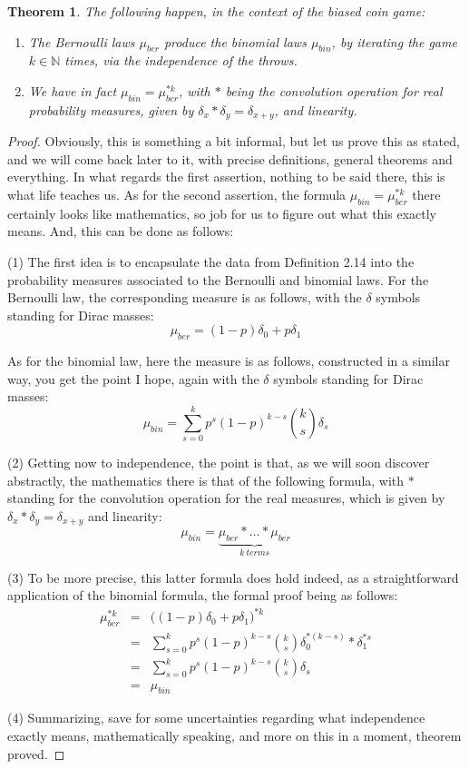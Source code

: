 \documentclass[12pt]{amsbook}
\newtheorem{theorem}{Theorem}[chapter]
\begin{document}
\begin{theorem}
The following happen, in the context of the biased coin game:
\begin{enumerate}
\item The Bernoulli laws $\mu_{ber}$ produce the binomial laws $\mu_{bin}$, by iterating the game $k\in\mathbb N$ times, via the independence of the throws.

\item We have in fact $\mu_{bin}=\mu_{ber}^{*k}$, with $*$ being the convolution operation for real probability measures, given by $\delta_x*\delta_y=\delta_{x+y}$, and linearity.
\end{enumerate}
\end{theorem}

\begin{proof}
Obviously, this is something a bit informal, but let us prove this as stated, and we will come back later to it, with precise definitions, general theorems and everything. In what regards the first assertion, nothing to be said there, this is what life teaches us. As for the second assertion, the formula $\mu_{bin}=\mu_{ber}^{*k}$ there certainly looks like mathematics, so job for us to figure out what this exactly means. And, this can be done as follows:

\bigskip

(1) The first idea is to encapsulate the data from Definition 2.14 into the probability measures associated to the Bernoulli and binomial laws. For the Bernoulli law, the corresponding measure is as follows, with the $\delta$ symbols standing for Dirac masses:
$$\mu_{ber}=(1-p)\delta_0+p\delta_1$$

As for the binomial law, here the measure is as follows, constructed in a similar way, you get the point I hope, again with the $\delta$ symbols standing for Dirac masses:
$$\mu_{bin}=\sum_{s=0}^kp^s(1-p)^{k-s}\binom{k}{s}\delta_s$$

(2) Getting now to independence, the point is that, as we will soon discover abstractly, the mathematics there is that of the following formula, with $*$ standing for the convolution operation for the real measures, which is given by $\delta_x*\delta_y=\delta_{x+y}$ and linearity:
$$\mu_{bin}=\underbrace{\mu_{ber}*\ldots*\mu_{ber}}_{k\ terms}$$

(3) To be more precise, this latter formula does hold indeed, as a straightforward application of the binomial formula, the formal proof being as follows:
\begin{eqnarray*}
\mu_{ber}^{*k}
&=&\big((1-p)\delta_0+p\delta_1\big)^{*k}\\
&=&\sum_{s=0}^kp^s(1-p)^{k-s}\binom{k}{s}\delta_0^{*(k-s)}*\delta_1^{*s}\\
&=&\sum_{s=0}^kp^s(1-p)^{k-s}\binom{k}{s}\delta_s\\
&=&\mu_{bin}
\end{eqnarray*}

(4) Summarizing, save for some uncertainties regarding what independence exactly means, mathematically speaking, and more on this in a moment, theorem proved.
\end{proof}
\end{document}
